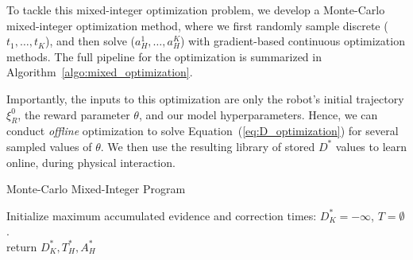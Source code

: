 To tackle this mixed-integer optimization problem, we develop a Monte-Carlo mixed-integer optimization method, where we first randomly sample discrete ($t_1, \ldots, t_K$), and then solve ($a_H^1, \ldots, a_H^K$) with gradient-based continuous optimization methods. The full pipeline for the optimization is summarized in Algorithm~\ref{algo:mixed_optimization}.

Importantly, the inputs to this optimization are only the robot's initial trajectory $\xi_R^0$, the reward parameter $\theta$, and our model hyperparameters. Hence, we can conduct \textit{offline} optimization to solve Equation~(\ref{eq:D_optimization}) for several sampled values of $\theta$. We then use the resulting library of stored $D^*$ values to learn online, during physical interaction.

\begin{algorithm}[t]
 \caption{Monte-Carlo Mixed-Integer Program
 }
 \label{algo:mixed_optimization}
 \SetAlgoLined
 Initialize maximum accumulated evidence and correction times: $D_K^* = -\infty$, $T = \emptyset$.\\
 
return $D_K^*, T_H^*, A_H^*$
\end{algorithm}


